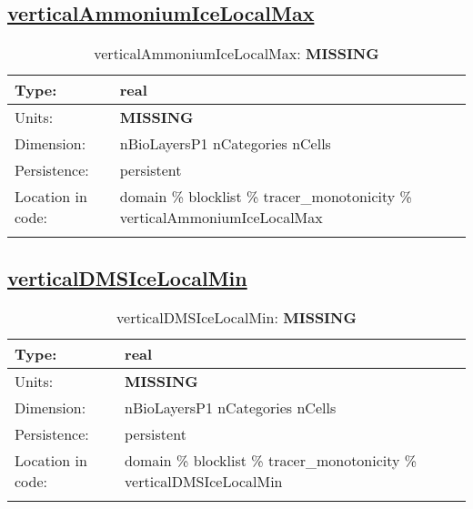 \subsection[verticalAmmoniumIceLocalMax]{\hyperref[sec:var_tab_tracer_monotonicity]{verticalAmmoniumIceLocalMax}}
\label{subsec:var_sec_tracer_monotonicity_verticalAmmoniumIceLocalMax}
\begin{center}
\begin{longtable}{| p{2.0in} | p{4.0in} |}
        \hline 
        Type: & real \\
        \hline 
        Units: & {\bf \color{red} MISSING} \\
        \hline 
        Dimension: & nBioLayersP1 nCategories nCells \\
        \hline 
        Persistence: & persistent \\
        \hline 
         Location in code: & domain \% blocklist \% tracer\_monotonicity \% verticalAmmoniumIceLocalMax \\
         \hline 
    \caption{verticalAmmoniumIceLocalMax: {\bf \color{red} MISSING}}
\end{longtable}
\end{center}
\subsection[verticalDMSIceLocalMin]{\hyperref[sec:var_tab_tracer_monotonicity]{verticalDMSIceLocalMin}}
\label{subsec:var_sec_tracer_monotonicity_verticalDMSIceLocalMin}
\begin{center}
\begin{longtable}{| p{2.0in} | p{4.0in} |}
        \hline 
        Type: & real \\
        \hline 
        Units: & {\bf \color{red} MISSING} \\
        \hline 
        Dimension: & nBioLayersP1 nCategories nCells \\
        \hline 
        Persistence: & persistent \\
        \hline 
         Location in code: & domain \% blocklist \% tracer\_monotonicity \% verticalDMSIceLocalMin \\
         \hline 
    \caption{verticalDMSIceLocalMin: {\bf \color{red} MISSING}}
\end{longtable}
\end{center}
